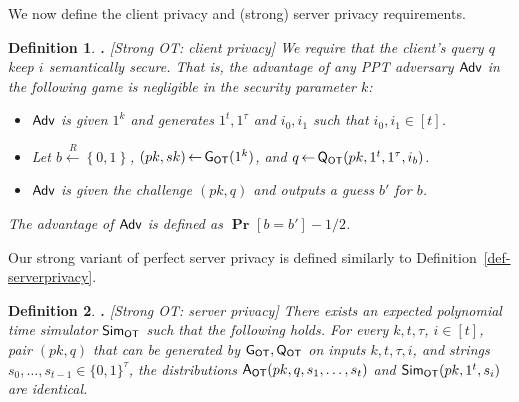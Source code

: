 \documentclass{article}
\newcommand{\genot}{{\sf G_{OT}}}
\newcommand{\queot}{{\sf Q_{OT}}}
\newcommand{\ansot}{{\sf A_{OT}}}
\newcommand{\simot}{{\sf Sim_{OT}}}
\newcommand{\otl}{{\tau}}
\newcommand{\adv}{{\sf Adv }}
\newcommand{\set}[1]{\left\{#1\right\}}
\newtheorem{DEFINITION}{Definition}[section]
\newenvironment{definition}{\begin{DEFINITION} \hspace{-.85em} {\bf .} \rm}%
	{\end{DEFINITION}}
\newcommand{\from}{{\,\leftarrow\,}}
\newcommand{\prob}[2][]{{\mathop{\mathbf{Pr}}_{#1}\!{\left[{#2}\right]}}}
\newcommand{\usamp}[2]{#1\stackrel{R}{\leftarrow}#2}
\newcommand{\bools}[1][]{{\set{0,1}}^{#1}}
\newcommand{\bp}{\mbox{BP}\;}
\newcommand{\ot}{\mbox{OT}\;}
\newcommand{\ideal}{{\sf Ideal}}
\newcommand{\eps}{{\epsilon}}
\begin{document}
We now define the client privacy and (strong) server privacy
requirements.
\begin{definition}[Strong OT: client privacy]
We require that the client's query $q$ keep $i$ semantically secure.
That is, the advantage of any PPT adversary $\adv$ in the following
game is negligible in the security parameter $k$:
\begin{itemize}
\item $\adv$ is given $1^k$ and generates $1^t, 1^\otl$ and
$i_0,i_1$ such that $i_0,i_1\in{[t]}$.
\item Let $\usamp{b}{\bools}$, $(pk,sk)\from \genot(1^k)$,
and $q\from \queot(pk,1^t,1^\otl,i_b)$.
\item $\adv$ is given the challenge $(pk,q)$ and outputs a guess
$b'$ for $b$.
\end{itemize}
The advantage of $\adv$ is defined as $\prob{b=b'}-1/2$.
\end{definition}
Our strong variant of perfect server privacy is defined similarly to
Definition~\ref{def-serverprivacy}.
\begin{definition}[Strong OT: server privacy]
\label{def-ot-serv-priv} There exists an expected polynomial time
simulator $\simot$ such that the following holds. For every
$k,t,\otl$, $i\in[t]$, pair $(pk,q)$ that can be generated by
$\genot,\queot$ on inputs $k,t,\otl,i$, and strings
$s_0,\ldots,s_{t-1}\in\{0,1\}^\otl$, the distributions
$\ansot(pk,q,s_1,\ldots,s_t)$ and $\simot(pk, 1^t, s_i)$ are
identical.
\end{definition}

%
\end{document}
